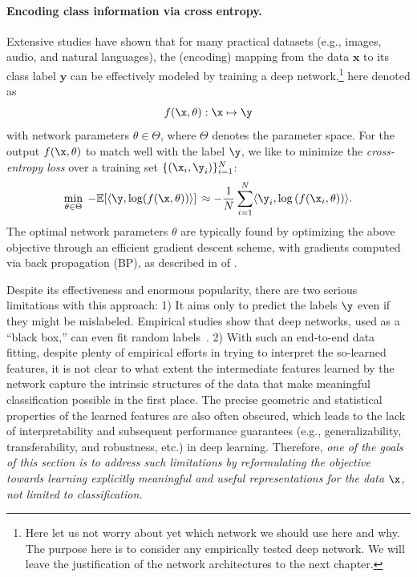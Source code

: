 \documentclass[../../book-main.tex]{subfiles}
\begin{document}
\paragraph{Encoding class information via cross entropy.}  Extensive studies have shown that for many practical datasets (e.g., images, audio, and natural languages), the (encoding) mapping from the data $\bm{x}$ to its class label $\bm{y}$ can be effectively modeled by training a deep network,\footnote{Here let us not worry about yet which network we should use here and why. The purpose here is to consider any empirically tested deep network. We will leave the justification of the network architectures to the next chapter.} here denoted as $$f(\x, \theta):\x \mapsto \y$$ with network parameters $\theta \in \Theta$, where $\Theta$ denotes the parameter space. For the output $f(\x, \theta)$ to match well with the label $\y$, we like to  minimize the {\em cross-entropy loss} over a training set $\{(\x_i, \y_i)\}_{i=1}^N$: 
\begin{equation}
   \min_{\theta \in \Theta} \; - \mathbb{E}[\langle \y, \log(f(\x, \theta)) \rangle] \, \approx - \frac{1}{N}\sum_{i=1}^N \langle \y_i, \log\left(f(\x_i, \theta)\right) \rangle.
   \label{chap4-eqn:cross-entropy}
\end{equation}
The optimal network parameters $\theta$ are typically found by optimizing the above objective through an efficient gradient descent scheme, with gradients computed via back propagation (BP), as described in  of .

Despite its effectiveness and enormous popularity, there are two serious limitations with this approach:  1) It aims only to predict the labels $\y$ even if they might be mislabeled. Empirical studies show that deep networks, used as a ``black box,'' can even fit random labels~\cite{zhang2017understanding}.
2) With such an end-to-end data fitting,
despite plenty of empirical efforts in trying to interpret the so-learned
features, %
it is not clear to what extent the intermediate features learned by the network capture the intrinsic structures of the data that make meaningful classification possible in the first place. The precise geometric and statistical properties of the learned features are also often obscured, which leads to the lack of interpretability and subsequent performance guarantees (e.g., generalizability, transferability, and robustness, etc.) in deep learning.
Therefore, {\em one of the goals of this section is to address such limitations by reformulating the objective towards learning explicitly meaningful and useful representations for the data $\x$, not limited to classification.}
\end{document}
